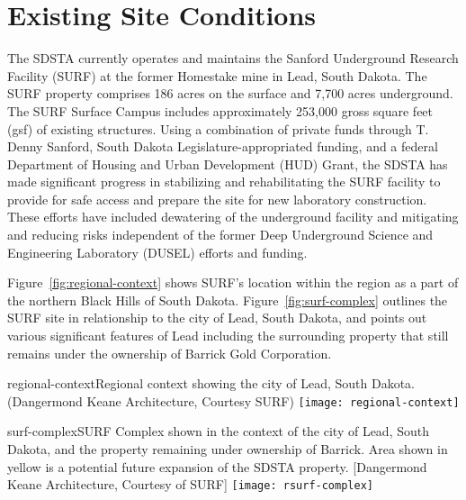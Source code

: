 \chapter{Existing Site Conditions}
\label{ch:fscf-site-cond}


The SDSTA currently operates and maintains the Sanford Underground Research Facility (SURF) at the former Homestake mine in Lead, South Dakota. The SURF property comprises 186 acres on the surface and 7,700 acres underground. The SURF Surface Campus includes approximately 253,000 gross square feet (gsf) of existing structures. Using a combination of private funds through T. Denny Sanford, South Dakota Legislature-appropriated funding, and a federal Department of Housing and Urban Development (HUD) Grant, the SDSTA has made significant progress in stabilizing and rehabilitating the SURF facility to provide for safe access and prepare the site for new laboratory construction. These efforts have included dewatering of the underground facility and mitigating and reducing risks independent of the former Deep Underground Science and Engineering Laboratory (DUSEL) efforts and funding.

Figure~\ref{fig:regional-context} shows SURF's location within the region as a part of the northern Black Hills of South Dakota. Figure~\ref{fig:surf-complex} outlines the SURF site in relationship to the city of Lead, South Dakota, and points out various significant features of Lead including the surrounding property that still remains under the ownership of Barrick Gold Corporation.

\begin{cdrfigure}{regional-context}{Regional context showing the city of Lead, South Dakota. (Dangermond Keane Architecture, Courtesy SURF)}
\texttt{[image: regional-context]}
\end{cdrfigure}


\begin{cdrfigure}{surf-complex}{SURF Complex shown in the context of the city of Lead, South Dakota, and the property remaining under ownership of Barrick. Area shown in yellow is a potential future expansion of the SDSTA property. [Dangermond Keane Architecture, Courtesy of SURF]}
\texttt{[image: rsurf-complex]}
\end{cdrfigure}


